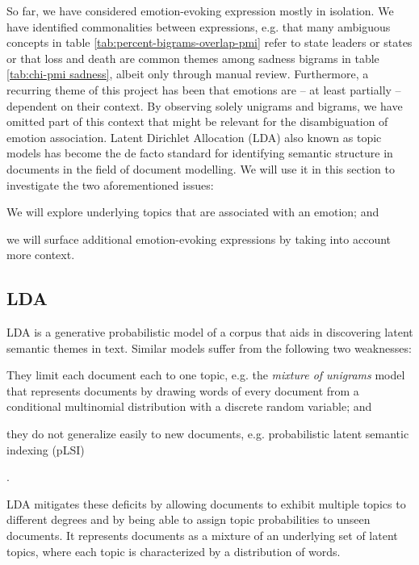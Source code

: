 So far, we have considered emotion-evoking expression mostly in isolation. We have identified commonalities between expressions, e.g. that many ambiguous concepts in table \ref{tab:percent-bigrams-overlap-pmi} refer to state leaders or states or that loss and death are common themes among sadness bigrams in table \ref{tab:chi-pmi sadness}, albeit only through manual review.
Furthermore, a recurring theme of this project has been that emotions are -- at least partially -- dependent on their context. By observing solely unigrams and bigrams, we have omitted part of this context that might be relevant for the disambiguation of emotion association.
Latent Dirichlet Allocation (LDA) also known as topic models has become the de facto standard for identifying semantic structure in documents in the field of document modelling. We will use it in this section to investigate the two aforementioned issues: \begin{inparaenum} \item We will explore underlying topics that are associated with an emotion; and \item we will surface additional emotion-evoking expressions by taking into account more context. \end{inparaenum}

\subsection{LDA}

LDA is a generative probabilistic model of a corpus that aids in discovering latent semantic themes in text. Similar models suffer from the following two weaknesses: \begin{inparaenum} \item They limit each document each to one topic, e.g. the \textit{mixture of unigrams} model \cite{mixture_of_unigrams} that represents documents by drawing words of every document from a conditional multinomial distribution with a discrete random variable; and \item they do not generalize easily to new documents, e.g. probabilistic latent semantic indexing (pLSI) \cite{plsi} \end{inparaenum}.

LDA mitigates these deficits by allowing documents to exhibit multiple topics to different degrees and by being able to assign topic probabilities to unseen documents. It represents documents as a mixture of an underlying set of latent topics, where each topic is characterized by a distribution of words.

